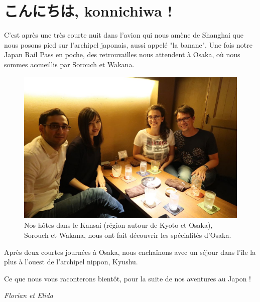 \hypertarget{ux3053ux3093ux306bux3061ux306f-konnichiwa}{%
\section{こんにちは, konnichiwa
!}\label{ux3053ux3093ux306bux3061ux306f-konnichiwa}}

C'est après une très courte nuit dans l'avion qui nous amène de Shanghai
que nous posons pied sur l'archipel japonais, aussi appelé "la banane".
Une fois notre Japan Rail Pass en poche, des retrouvailles nous
attendent à Osaka, où nous sommes accueillis par Sorouch et Wakana.

\begin{figure}
\centering
\includegraphics{images/20180625_osaka.JPG}
\caption{Nos hôtes dans le Kansai (région autour de Kyoto et Osaka),
Sorouch et Wakana, nous ont fait découvrir les spécialités d'Osaka.}
\end{figure}

Après deux courtes journées à Osaka, nous enchaînons avec un séjour dans
l'île la plus à l'ouest de l'archipel nippon, Kyushu.

Ce que nous vous raconterons bientôt, pour la suite de nos aventures au
Japon !

\emph{Florian et Elida}
